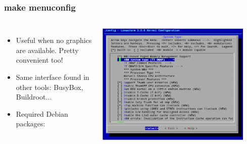 \begin{frame}
  \frametitle{make menuconfig}
  \begin{columns}
    \begin{itemize}
      \item Useful when no graphics are available. Pretty convenient too!
      \item Same interface found in other tools: BusyBox, Buildroot...
      \item Required Debian packages: 
    \end{itemize}
    \includegraphics[width=0.9\textwidth]{slides/sysdev-kernel-building/menuconfig-screenshot.png}
  \end{columns}
\end{frame}


